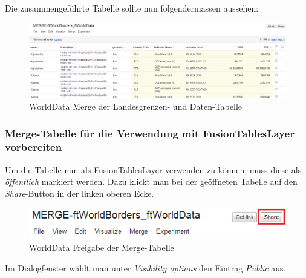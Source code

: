Die zusammengeführte Tabelle sollte nun folgendermassen aussehen:

\begin{figure}[H]
	\centering
	\includegraphics[scale=0.4]{images/usecase1-worlddata/documentation/worlddata-merge_done.png}
	\caption{WorldData Merge der Landesgrenzen- und Daten-Tabelle}
	\label{worlddata-merge_done}
\end{figure}

\subsubsection{Merge-Tabelle für die Verwendung mit FusionTablesLayer vorbereiten}
Um die Tabelle nun als FusionTablesLayer verwenden zu können, muss diese als \emph{öffentlich} markiert werden. Dazu klickt man bei der geöffneten Tabelle auf den \emph{Share}-Button in der linken oberen Ecke.

\begin{figure}[H]
	\centering
	\includegraphics{images/usecase1-worlddata/documentation/worlddata-prepare_fusiontableslayer1.png}
	\caption{WorldData Freigabe der Merge-Tabelle}
	\label{worlddata-prepare_fusiontableslayer1}
\end{figure}

Im Dialogfenster wählt man unter \emph{Visibility options} den Eintrag \emph{Public} aus.

